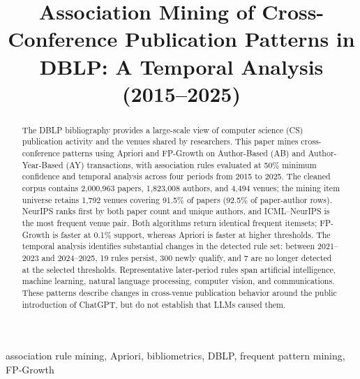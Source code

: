 ﻿\documentclass[conference]{IEEEtran}
\begin{document}
\title{Association Mining of Cross-Conference Publication Patterns in DBLP: A Temporal Analysis (2015--2025)}

\author{
\and
{}
}

\maketitle

\begin{abstract}
The DBLP bibliography provides a large-scale view of computer science (CS) publication activity and the venues shared by researchers. This paper mines cross-conference patterns using Apriori and FP-Growth on Author-Based (AB) and Author-Year-Based (AY) transactions, with association rules evaluated at 50\% minimum confidence and temporal analysis across four periods from 2015 to 2025. The cleaned corpus contains 2,000,963 papers, 1,823,008 authors, and 4,494 venues; the mining item universe retains 1,792 venues covering 91.5\% of papers (92.5\% of paper-author rows). NeurIPS ranks first by both paper count and unique authors, and ICML--NeurIPS is the most frequent venue pair. Both algorithms return identical frequent itemsets; FP-Growth is faster at 0.1\% support, whereas Apriori is faster at higher thresholds. The temporal analysis identifies substantial changes in the detected rule set: between 2021--2023 and 2024--2025, 19 rules persist, 300 newly qualify, and 7 are no longer detected at the selected thresholds. Representative later-period rules span artificial intelligence, machine learning, natural language processing, computer vision, and communications. These patterns describe changes in cross-venue publication behavior around the public introduction of ChatGPT, but do not establish that LLMs caused them.
\end{abstract}

\begin{IEEEkeywords}
association rule mining, Apriori, bibliometrics, DBLP, frequent pattern mining, FP-Growth
\end{IEEEkeywords}
\end{document}
